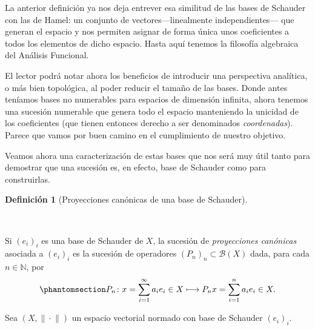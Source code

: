 \documentclass[
  spanish,
  letterpaper,
  DIV=11,
  numbers=noendperiod]{scrreprt}
\theoremstyle{definition}
\newtheorem{definition}[theorem]{Definición}
\theoremstyle{remark}
\theoremstyle{definition}
\theoremstyle{exampstyle}
\theoremstyle{plain}
\theoremstyle{plain}
\theoremstyle{definition}
\newtheorem{definition}{Definición}[chapter]
\theoremstyle{plain}
\theoremstyle{remark}
\begin{document}
La anterior definición ya nos deja entrever esa similitud de las bases
de Schauder con las de Hamel: un conjunto de vectores---linealmente
independientes--- que generan el espacio y nos permiten asignar de forma
única unos coeficientes a todos los elementos de dicho espacio. Hasta
aquí tenemos la filosofía algebraica del Análisis Funcional.

El lector podrá notar ahora los beneficios de introducir una perspectiva
analítica, o más bien topológica, al poder reducir el tamaño de las
bases. Donde antes teníamos bases no numerables para espacios de
dimensión infinita, ahora tenemos una sucesión numerable que genera todo
el espacio manteniendo la unicidad de los coeficientes (que tienen
entonces derecho a ser denominados \emph{coordenadas}). Parece que vamos
por buen camino en el cumplimiento de nuestro objetivo.

Veamos ahora una caracterización de estas bases que nos será muy útil
tanto para demostrar que una sucesión es, en efecto, base de Schauder
como para construirlas.

\begin{definition}[Proyecciones canónicas de una base de
Schauder]\protect\hypertarget{def-ProyeccionesCanonicas}{}\label{def-ProyeccionesCanonicas}

~

\hspace{1mm}

Si \((e_i)_i\) es una base de Schauder de \(X\), la sucesión de
\emph{proyecciones canónicas} asociada a \((e_i)_i\) es la sucesión de
operadores \((P_n)_n\subset\mathcal{B}(X)\) dada, para cada
\(n\in\mathbb{N}\), por
\begin{equation}\protect\phantomsection\label{eq-ProyCanon}{
    P_n\colon x=\sum_{i=1}^\infty a_ie_i\in X\longmapsto P_nx=\sum_{i=1}^n a_ie_i\in X.
}\end{equation}

\end{definition}

Sea \((X,\|\!\cdot\!\|)\) un espacio vectorial normado con base de
Schauder \((e_i)_i\).
\end{document}
